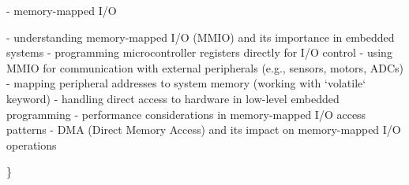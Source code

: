 \begin{DoxyVerb}
{}

- memory-mapped I/O {

    - understanding memory-mapped I/O (MMIO) and its importance in embedded systems
    - programming microcontroller registers directly for I/O control
    - using MMIO for communication with external peripherals (e.g., sensors, motors, ADCs)
    - mapping peripheral addresses to system memory (working with `volatile` keyword)
    - handling direct access to hardware in low-level embedded programming
    - performance considerations in memory-mapped I/O access patterns
    - DMA (Direct Memory Access) and its impact on memory-mapped I/O operations

}
\end{DoxyVerb}
 \} 